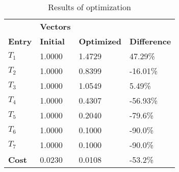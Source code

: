 \begin{table}[H]
\centering
\begin{tabular}{llll}
\textbf{}      & \cellcolor[HTML]{EFEFEF}\textbf{Vectors} & \textbf{} & \textbf{}         \\
\rowcolor[HTML]{EFEFEF} 
\textbf{Entry} & \textbf{Initial} & \textbf{Optimized} & \textbf{Difference} \\
$T_1$ & 1.0000 & 1.4729 & 47.29\% \\ 
$T_2$ & 1.0000 & 0.8399 & -16.01\% \\ 
$T_3$ & 1.0000 & 1.0549 & 5.49\% \\ 
$T_4$ & 1.0000 & 0.4307 & -56.93\% \\ 
$T_5$ & 1.0000 & 0.2040 & -79.6\% \\ 
$T_6$ & 1.0000 & 0.1000 & -90.0\% \\ 
$T_7$ & 1.0000 & 0.1000 & -90.0\% \\ 
\rowcolor[HTML]{EFEFEF} 
\textbf{Cost}  & 0.0230 & 0.0108 & -53.2\% \\ 
\end{tabular}
\caption{Results of optimization}
\label{tab:OptimizationAnalysis}
\end{table}